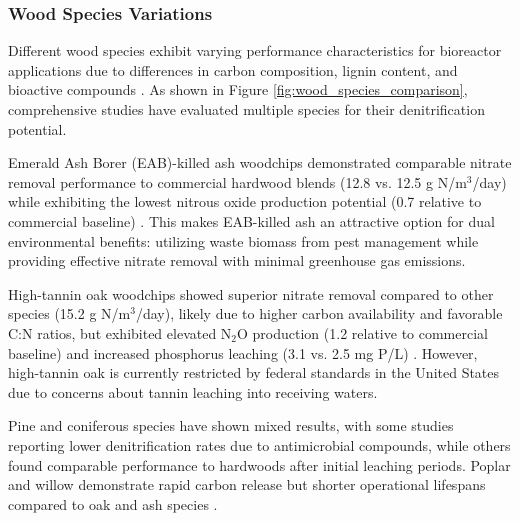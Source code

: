\documentclass[12pt,a4paper]{article}
\begin{document}
\subsubsection{Wood Species Variations}

Different wood species exhibit varying performance characteristics for bioreactor applications due to differences in carbon composition, lignin content, and bioactive compounds \citep{RN611}. As shown in Figure \ref{fig:wood_species_comparison}, comprehensive studies have evaluated multiple species for their denitrification potential.

Emerald Ash Borer (EAB)-killed ash woodchips demonstrated comparable nitrate removal performance to commercial hardwood blends (12.8 vs. 12.5 g N/m$^3$/day) while exhibiting the lowest nitrous oxide production potential (0.7 relative to commercial baseline) \citep{RN611}. This makes EAB-killed ash an attractive option for dual environmental benefits: utilizing waste biomass from pest management while providing effective nitrate removal with minimal greenhouse gas emissions.

High-tannin oak woodchips showed superior nitrate removal compared to other species (15.2 g N/m$^3$/day), likely due to higher carbon availability and favorable C:N ratios, but exhibited elevated N$_2$O production (1.2 relative to commercial baseline) and increased phosphorus leaching (3.1 vs. 2.5 mg P/L) \citep{RN611}. However, high-tannin oak is currently restricted by federal standards in the United States due to concerns about tannin leaching into receiving waters.

Pine and coniferous species have shown mixed results, with some studies reporting lower denitrification rates due to antimicrobial compounds, while others found comparable performance to hardwoods after initial leaching periods. Poplar and willow demonstrate rapid carbon release but shorter operational lifespans compared to oak and ash species \citep{RN611}.
\end{document}
